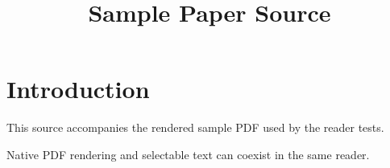 \documentclass{article}
\title{Sample Paper Source}
\begin{document}
\section{Introduction}
This source accompanies the rendered sample PDF used by the reader tests.
\begin{theorem}
Native PDF rendering and selectable text can coexist in the same reader.
\end{theorem}
\end{document}
